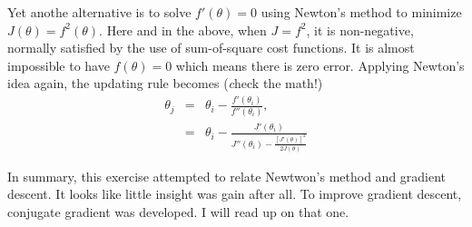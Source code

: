 Yet anothe alternative is to solve $f'(\theta)=0$ using Newton's method to minimize $J(\theta)=f^2(\theta)$. Here and in the above, when $J=f^2$, it is non-negative, normally satisfied by the use of sum-of-square cost functions. It is almost impossible to have $f(\theta)=0$ which means there is zero error. Applying Newton's idea again, the updating rule becomes (\emph check the math!)
\begin{eqnarray}
\theta_j &=& \theta_i - \frac{f'(\theta_i)}{f''(\theta_i)},\\
	 &=& \theta_i - \frac{J'(\theta_i)}{J''(\theta_i)-\frac{[J'(\theta)]^2}{2J(\theta)}}
\end{eqnarray}

In summary, this exercise attempted to relate Newtwon's method and gradient descent. It looks like little insight was gain after all. To improve gradient descent, conjugate gradient was developed. I will read up on that one.
